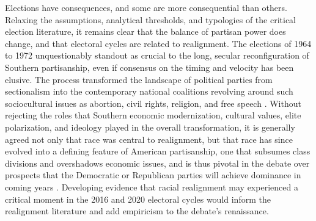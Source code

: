 Elections have consequences, and some are more consequential than others. Relaxing the assumptions, analytical thresholds, and typologies of the critical election literature, it remains clear that the balance of partisan power does change, and that electoral cycles are related to realignment. The elections of 1964 to 1972 unquestionably standout as crucial to the long, secular reconfiguration of Southern partisanship, even if consensus on the timing and velocity has been elusive. The process transformed the landscape of political parties from sectionalism into the contemporary national coalitions revolving around such sociocultural issues as abortion, civil rights, religion, and free speech \citep{adams_abortion:_1997, carmines_role_2002, carsey_changing_2006}. Without rejecting the roles that Southern economic modernization, cultural values, elite polarization, and ideology played in the overall transformation, it is generally agreed not only that race was central to realignment, but that race has since evolved into a defining feature of American partisanship, one that subsumes class divisions and overshadows economic issues, and is thus pivotal in the debate over prospects that the Democratic or Republican parties will achieve dominance in coming years \citep{carmines_issue_1989, carmines_mobilization_1995, miller_activists_2003, valentino_old_2005, knuckey_ideological_2001, phillips_emerging_2015, judis_emerging_2002}. Developing evidence that racial realignment may experienced a critical moment in the 2016 and 2020 electoral cycles would inform the realignment literature and add empiricism to the debate's renaissance.          

